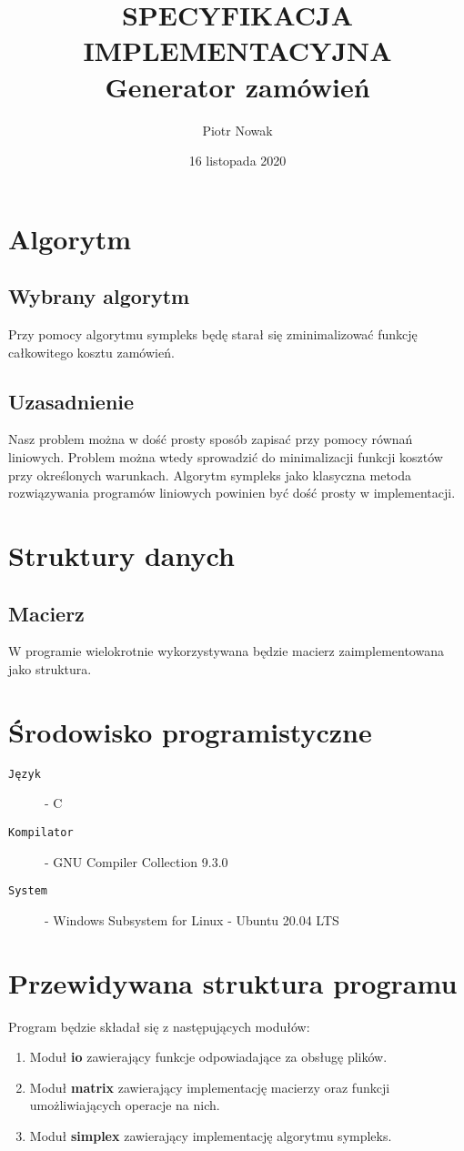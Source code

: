 \documentclass[a4paper,12pt,twoside]{article}
\title{SPECYFIKACJA IMPLEMENTACYJNA\\Generator zamówień}
\date{16 listopada 2020}
\author{Piotr Nowak}
\begin{document}
\maketitle

\section{Algorytm}
\subsection{Wybrany algorytm}
Przy pomocy algorytmu sympleks będę starał się zminimalizować funkcję całkowitego kosztu zamówień.
\subsection{Uzasadnienie}
Nasz problem można w dość prosty sposób zapisać przy pomocy równań liniowych. Problem można wtedy sprowadzić do minimalizacji funkcji kosztów przy określonych warunkach. Algorytm sympleks jako klasyczna metoda rozwiązywania programów liniowych powinien być dość prosty w implementacji. 
\section{Struktury danych}
\subsection{Macierz}
W programie wielokrotnie wykorzystywana będzie macierz zaimplementowana jako struktura.
\section{Środowisko programistyczne}
\begin{description}
\item[\texttt {Język }] - C 
\item[\texttt {Kompilator }] - GNU Compiler Collection 9.3.0
\item[\texttt {System }] - Windows Subsystem for Linux - Ubuntu 20.04 LTS
\end{description}
\section{Przewidywana struktura programu}
Program będzie składał się z następujących modułów:
\begin{enumerate}
\item Moduł \textbf{io} zawierający funkcje odpowiadające za obsługę plików.
\item Moduł \textbf{matrix} zawierający implementację macierzy oraz funkcji umożliwiających operacje na nich.
\item Moduł \textbf{simplex} zawierający implementację algorytmu sympleks.
\end{enumerate}
\end{document}
